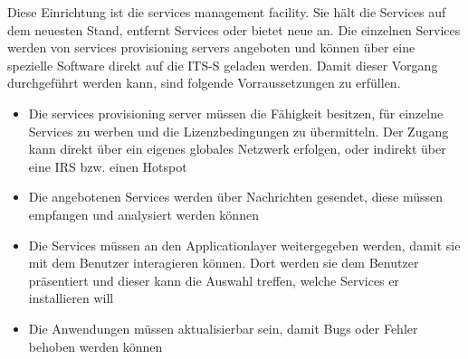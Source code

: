 Diese Einrichtung ist die services management facility. Sie hält die Services auf dem neuesten Stand, entfernt Services oder bietet neue an. Die einzelnen Services werden von services provisioning servers angeboten und können über eine spezielle Software direkt auf die \ac{ITS-S} geladen werden. Damit dieser Vorgang durchgeführt werden kann, sind folgende Vorraussetzungen zu erfüllen.
\begin{itemize}
	\item Die services provisioning server müssen die Fähigkeit besitzen, für einzelne Services zu werben und die Lizenzbedingungen zu übermitteln. Der Zugang kann direkt über ein eigenes globales Netzwerk erfolgen, oder indirekt über eine \ac{IRS} bzw. einen Hotspot
	\item Die angebotenen Services werden über Nachrichten gesendet, diese müssen empfangen und analysiert werden können
	\item Die Services müssen an den Applicationlayer weitergegeben werden, damit sie mit dem Benutzer interagieren können. Dort werden sie dem Benutzer präsentiert und dieser kann die Auswahl treffen, welche Services er installieren will
	\item Die Anwendungen müssen aktualisierbar sein, damit Bugs oder Fehler behoben werden können
\end{itemize}

